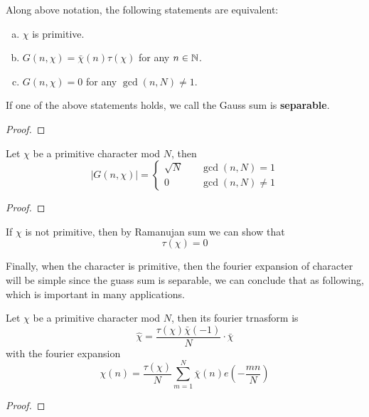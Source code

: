 \begin{lemma}
    Along above notation, the following statements are equivalent:
    \begin{enumerate} [(a)]
    \item \(\chi\) is primitive.
    \item \(G(n,\chi) = \bar{\chi}(n) \tau(\chi)\) for any \(n \in \mathbb{N}\).
    \item \(G(n,\chi) = 0\) for any \(\gcd(n,N) \neq 1\).
    \end{enumerate}
    If one of the above statements holds, we call the Gauss sum is \textbf{separable}.
\end{lemma}
\begin{proof}
    
\end{proof}

\begin{proposition}
    Let \(\chi\) be a primitive character mod \(N\), then
    \[|G(n,\chi)| = \begin{cases}
        \sqrt{N} \quad &\gcd(n,N) = 1 \\
        0 \quad &\gcd(n,N) \neq 1
    \end{cases}\]
\end{proposition}

\begin{proof}
    
\end{proof}

\begin{remark}
    If \(\chi\) is not primitive, then by Ramanujan sum we can show that 
    \[\tau(\chi) = 0\]
\end{remark}

Finally, when the character is primitive, then the fourier expansion of character will be simple since the guass sum is separable, we can conclude that as following, which is important in many applications.

\begin{colortheorem}
    Let \(\chi\) be a primitive character mod \(N\), then its fourier trnasform is 
    \[\hat{\chi} = \frac{\tau(\chi) \bar{\chi}(-1)}{N} \cdot \bar{\chi}\]
    with the fourier expansion
    \[\chi(n) = \frac{\tau(\chi)}{N} \sum_{m = 1}^N \bar{\chi}(n) e(-\frac{mn}{N})\]
\end{colortheorem}

\begin{proof}
    
\end{proof}

